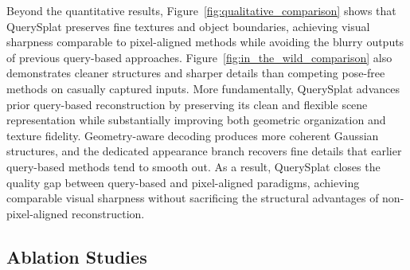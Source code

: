\documentclass[letterpaper]{article} %
\begin{document}

Beyond the quantitative results, Figure~\ref{fig:qualitative_comparison} shows that QuerySplat preserves fine textures and object boundaries, achieving visual sharpness comparable to pixel-aligned methods while avoiding the blurry outputs of previous query-based approaches. Figure~\ref{fig:in_the_wild_comparison} also demonstrates cleaner structures and sharper details than competing pose-free methods on casually captured inputs. More fundamentally, QuerySplat advances prior query-based reconstruction by preserving its clean and flexible scene representation while substantially improving both geometric organization and texture fidelity. Geometry-aware decoding produces more coherent Gaussian structures, and the dedicated appearance branch recovers fine details that earlier query-based methods tend to smooth out. As a result, QuerySplat closes the quality gap between query-based and pixel-aligned paradigms, achieving comparable visual sharpness without sacrificing the structural advantages of non-pixel-aligned reconstruction.







\subsection{Ablation Studies}
\label{sec:ablation}
\end{document}
